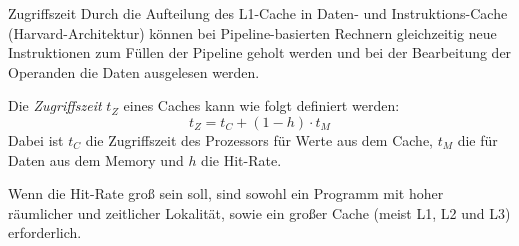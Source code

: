 \begin{defi}[Cache]{Zugriffszeit}
  Durch die Aufteilung des L1-Cache in Daten- und Instruktions-Cache (Harvard-Architektur) können bei Pipeline-basierten Rechnern gleichzeitig neue Instruktionen zum Füllen der Pipeline geholt werden und bei der Bearbeitung der Operanden die Daten ausgelesen werden.

  Die \emph{Zugriffszeit} $t_Z$ eines Caches kann wie folgt definiert werden:
  \[
    t_Z = t_{C} + (1 - h) \cdot t_{M}
  \]
  Dabei ist $t_C$ die Zugriffszeit des Prozessors für Werte aus dem Cache, $t_M$ die für Daten aus dem Memory und $h$ die Hit-Rate.

  Wenn die Hit-Rate groß sein soll, sind sowohl ein Programm mit hoher räumlicher und zeitlicher Lokalität, sowie ein großer Cache (meist L1, L2 und L3) erforderlich.
\end{defi}


